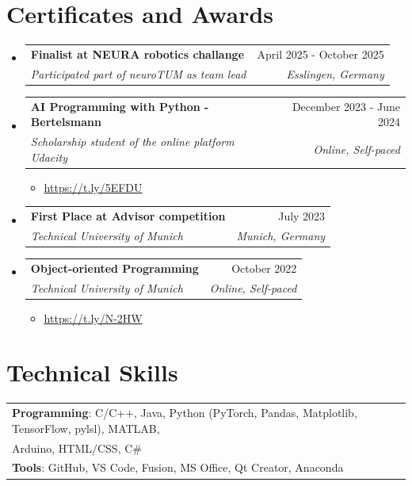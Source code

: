 \documentclass[a4paper,11pt]{article}
\makeatletter
\newcommand{\resumeItem}[1]{
  \item{
    {#1 \vspace{-4pt}}
  }
}
\newcommand{\resumeSubheading}[4]{
  \vspace{-2pt}\item
    \begin{tabular*}{0.97\textwidth}[t]{l@{\extracolsep{\fill}}r}
      \textbf{#1} & #2 \\
      \textit{\small #3} & \textit{\small #4} \\
    \end{tabular*}\vspace{-10pt}
}
\newcommand{\resumeSubHeadingListStart}{\begin{itemize}[leftmargin=0.15in, label={}]}
\newcommand{\resumeSubHeadingListEnd}{\end{itemize}}
\newcommand{\resumeItemListStart}{\begin{itemize}}
\newcommand{\resumeItemListEnd}{\end{itemize}\vspace{-2pt}}
\makeatother
\begin{document}
\section{Certificates and Awards}
\resumeSubHeadingListStart
\resumeSubheading   
        {Finalist at NEURA robotics challange}{April 2025 - October 2025}
        {Participated part of neuroTUM as team lead}{Esslingen, Germany}\break
        \vspace{0.1cm}
\resumeSubheading   
        {AI Programming with Python - Bertelsmann}{December 2023 - June 2024}
        {Scholarship student of the online platform Udacity}{Online, Self-paced}\break
        \resumeItemListStart
         \small\resumeItem{{\url{https://t.ly/5EFDU}}}
        \resumeItemListEnd
        \vspace{0.1cm}
\resumeSubheading   
        {First Place at Advisor competition}{July 2023}
        {Technical University of Munich}{Munich, Germany}\break
      \vspace{0.1cm}
\resumeSubheading
        {Object-oriented Programming}{October 2022}
        {Technical University of Munich}{Online, Self-paced}
      \resumeItemListStart
        \small\resumeItem{{\url{https://t.ly/N-2HW}}}

    \resumeItemListEnd


\resumeSubHeadingListEnd


\section{Technical Skills}
\small
\begin{tabular*}{\textwidth}{@{\extracolsep{\fill}} l}
\textbf{Programming}: C/C++, Java, Python (PyTorch, Pandas, Matplotlib, TensorFlow, pylsl), MATLAB,\\ Arduino, HTML/CSS, C\# \\
\vspace{0.1cm}
\textbf{Tools}: GitHub, VS Code, Fusion, MS Office, Qt Creator, Anaconda
\end{tabular*}

\end{document}
